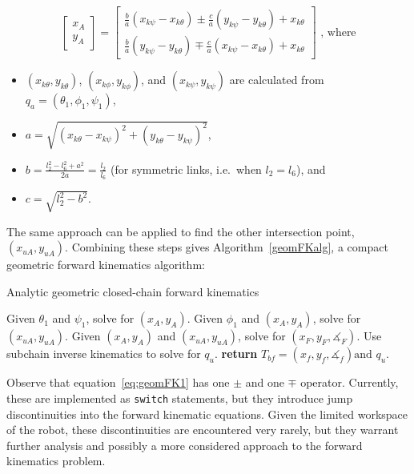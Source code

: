 \documentclass{report}
\begin{document}
\begin{equation}\label{eq:geomFK1}
\begin{bmatrix}
x_{A} \\
y_{A}
\end{bmatrix} = 
\begin{bmatrix}
\frac{b}{a}\left(x_{k\psi} - x_{k\theta}\right) \pm \frac{c}{a}\left(y_{k\psi} - y_{k\theta}\right) + x_{k\theta} \\
\frac{b}{a}\left(y_{k\psi} - y_{k\theta}\right) \mp \frac{c}{a}\left(x_{k\psi} - x_{k\theta}\right) + x_{k\theta}
\end{bmatrix}\text{ , where}
\end{equation}
\begin{itemize}
\item $\left(x_{k\theta},y_{k\theta}\right)$, $\left(x_{k\phi},y_{k\phi}\right)$, and $\left(x_{k\psi},y_{k\psi}\right)$ are calculated from $q_{a} = \left(\theta_{1},\phi_{1},\psi_{1}\right)$,
\item $a = \sqrt{\left(x_{k\theta} - x_{k\psi}\right)^{2} + \left(y_{k\theta} - y_{k\psi}\right)^{2}}$,
\item $b = \frac{l_2^2 - l_6^2 + a^2}{2a} = \frac{l_2}{l_6}$ (for symmetric links, i.e.\ when $l_2 = l_6$), and
\item $c = \sqrt{l_2^2 - b^2}$.
\end{itemize}

The same approach can be applied to find the other intersection point, $\left(x_{uA},y_{uA}\right)$. Combining these steps gives Algorithm~\ref{geomFKalg}, a compact geometric forward kinematics algorithm:

\begin{algorithm}
	\caption{Analytic geometric closed-chain forward kinematics} \label{geomFKalg}
	\begin{algorithmic}
		\State Given $\theta_{1}$ and $\psi_{1}$, solve for $\left(x_{A},y_{A}\right)$.
		\State Given $\phi_{1}$ and $\left(x_{A},y_{A}\right)$, solve for $\left(x_{uA},y_{uA}\right)$.
		\State Given $\left(x_{A},y_{A}\right)$ and $\left(x_{uA},y_{uA}\right)$, solve for $\left(x_{F},y_{F}, \measuredangle_{F}\right)$.
		\State Use subchain inverse kinematics to solve for $q_{u}$.
		\State \textbf{return} $T_{bf} = \left(x_{f}, y_{f}, \measuredangle_{f}\right) \text{and } q_{u}$.
		\EndFunction
	\end{algorithmic}
\end{algorithm}

Observe that equation~\ref{eq:geomFK1} has one $\pm$ and one $\mp$ operator. Currently, these are implemented as \texttt{switch} statements, but they introduce jump discontinuities into the forward kinematic equations. Given the limited workspace of the robot, these discontinuities are encountered very rarely, but they warrant further analysis and possibly a more considered approach to the forward kinematics problem.
\end{document}
